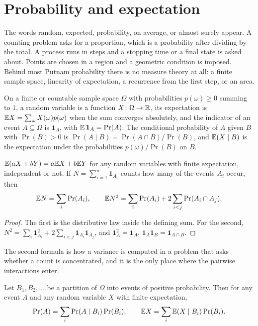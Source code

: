 \section{Probability and expectation}

\begin{recognise}
The words random, expected, probability, on average, or almost surely appear. A counting problem asks for a proportion, which is a probability after dividing by the total. A process runs in steps and a stopping time or a final state is asked about. Points are chosen in a region and a geometric condition is imposed. Behind most Putnam probability there is no measure theory at all: a finite sample space, linearity of expectation, a recurrence from the first step, or an area.
\end{recognise}

\begin{definition}
On a finite or countable sample space $\Omega$ with probabilities $p(\omega)\ge 0$ summing to $1$, a random variable is a function $X\colon\Omega\to\mathbb{R}$, its expectation is $\mathbb{E} X=\sum_\omega X(\omega)p(\omega)$ when the sum converges absolutely, and the indicator of an event $A\subseteq\Omega$ is $\mathbf 1_A$, with $\mathbb{E}\,\mathbf 1_A=\Pr(A)$. The conditional probability of $A$ given $B$ with $\Pr(B)>0$ is $\Pr(A\mid B)=\Pr(A\cap B)/\Pr(B)$, and $\mathbb{E}(X\mid B)$ is the expectation under the probabilities $p(\omega)/\Pr(B)$ on $B$.
\end{definition}

\begin{theorem}
$\mathbb{E}(aX+bY)=a\mathbb{E} X+b\mathbb{E} Y$ for any random variables with finite expectation, independent or not. If $N=\sum_{i=1}^n\mathbf 1_{A_i}$ counts how many of the events $A_i$ occur, then
\[
\mathbb{E} N=\sum_i\Pr(A_i),\qquad \mathbb{E} N^2=\sum_i\Pr(A_i)+2\sum_{i<j}\Pr(A_i\cap A_j).
\]
\end{theorem}

\begin{proof}
The first is the distributive law inside the defining sum. For the second, $N^2=\sum_i\mathbf 1_{A_i}^2+2\sum_{i<j}\mathbf 1_{A_i}\mathbf 1_{A_j}$, and $\mathbf 1_{A}^2=\mathbf 1_A$, $\mathbf 1_A\mathbf 1_B=\mathbf 1_{A\cap B}$.
\end{proof}

The second formula is how a variance is computed in a problem that asks whether a count is concentrated, and it is the only place where the pairwise interactions enter.

\begin{theorem}
Let $B_1,B_2,\dots$ be a partition of $\Omega$ into events of positive probability. Then for any event $A$ and any random variable $X$ with finite expectation,
\[
\Pr(A)=\sum_i\Pr(A\mid B_i)\Pr(B_i),\qquad \mathbb{E} X=\sum_i\mathbb{E}(X\mid B_i)\Pr(B_i).
\]
\end{theorem}

